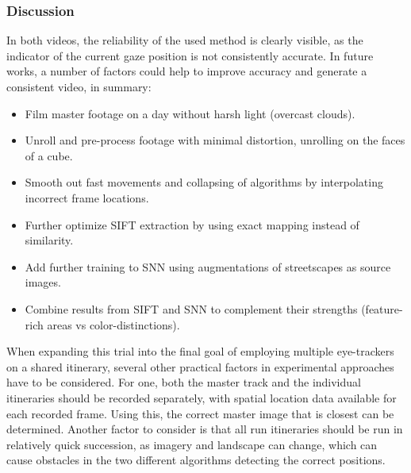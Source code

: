 \documentclass[sigconf, natbib=false, nonacm]{acmart}
\begin{document}
        \subsubsection{Discussion}
        In both videos, the reliability of the used method is clearly visible, as the indicator of the current gaze position is not consistently accurate. In future works, a number of factors could help to improve accuracy and generate a consistent video, in summary: 
        \begin{itemize}
            \item Film master footage on a day without harsh light (overcast clouds).
            \item Unroll and pre-process footage with minimal distortion, unrolling on the faces of a cube. 
            \item Smooth out fast movements and collapsing of algorithms by interpolating incorrect frame locations. 
            \item Further optimize SIFT extraction by using exact mapping instead of similarity. 
            \item Add further training to SNN using augmentations of streetscapes as source images. 
            \item Combine results from SIFT and SNN to complement their strengths (feature-rich areas vs color-distinctions). 
        \end{itemize}
        
        When expanding this trial into the final goal of employing multiple eye-trackers on a shared itinerary, several other practical factors in experimental approaches have to be considered. For one, both the master track and the individual itineraries should be recorded separately, with spatial location data available for each recorded frame. Using this, the correct master image that is closest can be determined. Another factor to consider is that all run itineraries should be run in relatively quick succession, as imagery and landscape can change, which can cause obstacles in the two different algorithms detecting the correct positions. 
\end{document}
